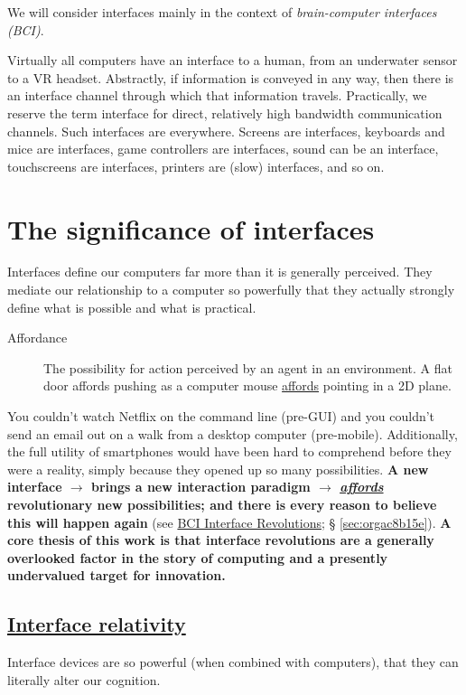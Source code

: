 \documentclass[logo,bsc,singlespacing,parskip]{infthesis}
\begin{document}
We will consider interfaces mainly in the context of \emph{brain-computer interfaces (BCI)}.

Virtually all computers have an interface to a human, from an underwater sensor to a VR headset.
Abstractly, if information is conveyed in any way, then there is an interface channel through which that information travels.
Practically, we reserve the term interface for direct, relatively high bandwidth communication channels.
Such interfaces are everywhere.
Screens are interfaces, keyboards and mice are interfaces, game controllers are interfaces, sound can be an interface, touchscreens are interfaces, printers are (slow) interfaces, and so on.
\section{The significance of interfaces}
\label{sec:orgfa8602d}
Interfaces define our computers far more than it is generally perceived.
They mediate our relationship to a computer so powerfully that they actually strongly define what is possible and what is practical.

\begin{mdframed}
\begin{description}
\item[{\label{org37ae42d}Affordance}] The possibility for action perceived by an agent in an environment. A flat door \label{org04df01f}affords pushing as a computer mouse \hyperref[org04df01f]{affords} pointing in a 2D plane.
\end{description}
\end{mdframed}

You couldn't watch Netflix on the command line (pre-GUI) and you couldn't send an email out on a walk from a desktop computer (pre-mobile).
Additionally, the full utility of smartphones would have been hard to comprehend before they were a reality, simply because they opened up so many possibilities.
\textbf{A new interface \(\rightarrow\) brings a new interaction paradigm \(\rightarrow\) \emph{\hyperref[org04df01f]{affords}} revolutionary new possibilities; and there is every reason to believe this will happen again} (see \hyperref[sec:orgac8b15e]{BCI Interface Revolutions}; § \ref{sec:orgac8b15e}).
\textbf{A core thesis of this work is that interface revolutions are a generally overlooked factor in the story of computing and a presently undervalued target for innovation.}
\subsection{\hyperref[org22c5c6a]{Interface relativity}}
\label{sec:orge685389}
Interface devices are so powerful (when combined with computers), that they can literally alter our cognition.
\end{document}
